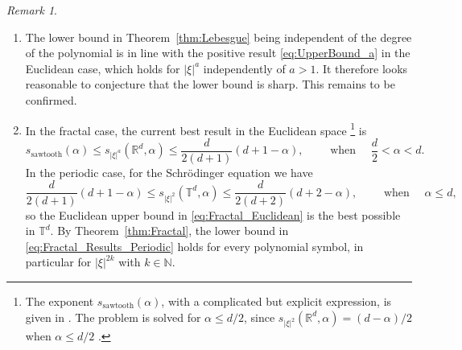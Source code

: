 \documentclass[11pt,reqno]{amsart}
\theoremstyle{definition}
\numberwithin{equation}{section}
\theoremstyle{remark}
\newtheorem{rem}[thm]{Remark}
\begin{document}
\begin{rem}
 
\begin{enumerate}
    \item[(a)] 
    The lower bound in Theorem~\ref{thm:Lebesgue} being independent of the degree of the polynomial is in line with the positive result \eqref{eq:UpperBound_a} in the Euclidean case, which holds for $|\xi|^a$ independently of $a > 1$. 
    It therefore looks reasonable to conjecture that the lower bound is sharp. This remains to be confirmed. 
    

    
    \item[(b)] 
    In the fractal case, 
    the current best result
in the Euclidean space \cite{DuZhang2019,LiLiXiao2021,EceizabarrenaPonceVanegas2022_2}\footnote{The exponent $s_{\text{sawtooth}}(\alpha)$, with a complicated but explicit expression, is given in \cite{EceizabarrenaPonceVanegas2022_2}. The problem is solved for $\alpha \leq d/2$, since 
$s_{|\xi|^2}(\mathbb R^d, \alpha) = (d-\alpha)/2$
when $\alpha \leq d/2$ \cite{BarceloBennetCarberyRogers2011,Zubrinic2002}.
}
is
\begin{equation}\label{eq:Fractal_Euclidean}
    s_{\text{sawtooth}}(\alpha)
    \leq s_{|\xi|^a}(\mathbb R^d, \alpha) \leq \frac{d}{2(d+1)}(d+1-\alpha),
     \qquad \text{ when } \quad  \frac{d}{2} < \alpha < d.
\end{equation} 
In the periodic case, for the Schr\"odinger equation we have  \cite{EceizabarrenaLuca2022}
\begin{equation}\label{eq:Fractal_Results_Periodic}
   \frac{d}{2(d+1)}(d+1-\alpha) \leq  s_{|\xi|^2}(\mathbb T^d, \alpha) \leq \frac{d}{2(d+2)}(d+2-\alpha), 
   \qquad \text{ when } \quad  \alpha \leq d,
\end{equation}
so the Euclidean upper bound in \eqref{eq:Fractal_Euclidean} is the best possible in $\mathbb T^d$.
By Theorem~\ref{thm:Fractal}, the lower bound in \eqref{eq:Fractal_Results_Periodic} holds for every polynomial symbol, in particular for $|\xi|^{2k}$ with $k \in \mathbb N$.

\end{enumerate}
\end{rem}
\end{document}
